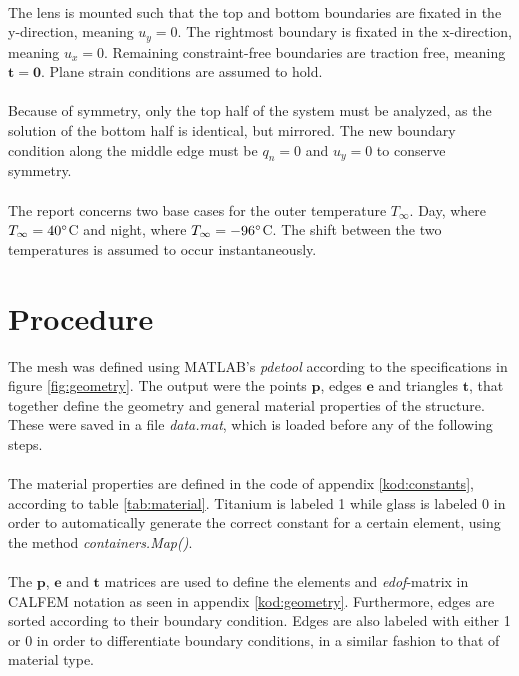 \documentclass[a4paper,11pt]{article}
\begin{document}
\\The lens is mounted such that the top and bottom boundaries are fixated in the y-direction, meaning $u_y=0$. The rightmost boundary is fixated in the x-direction, meaning $u_x=0$. Remaining constraint-free boundaries are traction free, meaning $\boldsymbol{t}=\boldsymbol{0}$. Plane strain conditions are assumed to hold.\\
\\Because of symmetry, only the top half of the system must be analyzed, as the solution of the bottom half is identical, but mirrored. The new boundary condition along the middle edge must be $q_n = 0$ and $u_y = 0$ to conserve symmetry.\\
\\The report concerns two base cases for the outer temperature $T_{\infty}$. Day, where $T_{\infty} = 40\degree$C and night, where $T_{\infty} = -96\degree$C. The shift between the two temperatures is assumed to occur instantaneously. 

\section{Procedure}

The mesh was defined using MATLAB's \textit{pdetool} according to the specifications in figure \ref{fig:geometry}. The output were the points $\boldsymbol p$, edges $\boldsymbol e$ and triangles $\boldsymbol t$, that together define the geometry and general material properties of the structure. These were saved in a file \textit{data.mat}, which is loaded before any of the following steps.\\
\\The material properties are defined in the code of appendix \ref{kod:constants}, according to table \ref{tab:material}. Titanium is labeled 1 while glass is labeled 0 in order to automatically generate the correct constant for a certain element, using the method \textit{containers.Map()}.\\
\\The $\boldsymbol p$, $\boldsymbol e$ and $\boldsymbol t$ matrices are used to define the elements and \textit{edof}-matrix in CALFEM notation as seen in appendix \ref{kod:geometry}. Furthermore, edges are sorted according to their boundary condition. Edges are also labeled with either 1 or 0 in order to differentiate boundary conditions, in a similar fashion to that of material type.
\end{document}
